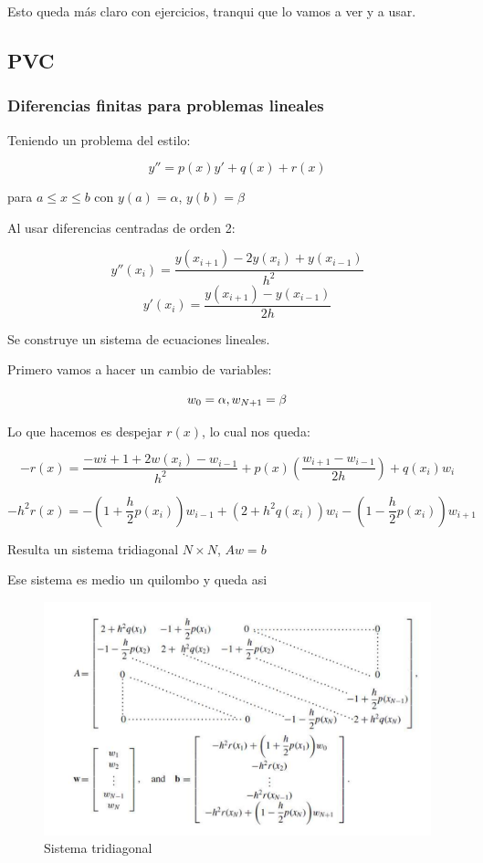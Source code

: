 Esto queda más claro con ejercicios, tranqui que lo vamos a ver y a usar. 

\subsection{PVC}
\subsubsection{Diferencias finitas para problemas lineales}

Teniendo un problema del estilo: 


$$y'' = p(x)y' + q(x) + r(x) $$

para $a \leq x \leq b$ con $y(a) = \alpha$, $y(b) = \beta$


Al usar diferencias centradas de orden 2:

$$
y''(x_i) = \frac{y(x_{i+1}) - 2y(x_i) + y(x_{i-1}) }{h^2}
$$
$$
y'(x_i) = \frac{y(x_{i + 1}) - y(x_{i-1})}{2h}
$$

Se construye un sistema de ecuaciones lineales.

Primero vamos a hacer un cambio de variables: 

$$w_0 = \alpha, \space w_{N + 1} = \beta$$

Lo que hacemos es despejar $r(x)$, lo cual nos queda:

$$-r(x) = \frac{-w{i+1} + 2w(x_i) - w_{i-1} }{h^2} + p(x)(\frac{w_{i + 1} - w_{i - 1}}{2h}) + q(x_i)w_i $$



$$-h^2r(x) = -(1 + \frac{h}{2} p(x_i))w_{i -1} + (2 + h^2 q(x_i))w_i - (1 - \frac{h}{2} p(x_i))w_{i + 1}$$


Resulta un sistema tridiagonal $N \times N$, $Aw = b$


Ese sistema es medio un quilombo y queda asi

\begin{figure}[ht]
    \centering
    \includegraphics[width=1\linewidth]{pvc_sistema.png}
    \caption{Sistema tridiagonal}
    \label{fig:enter-label}
\end{figure}

